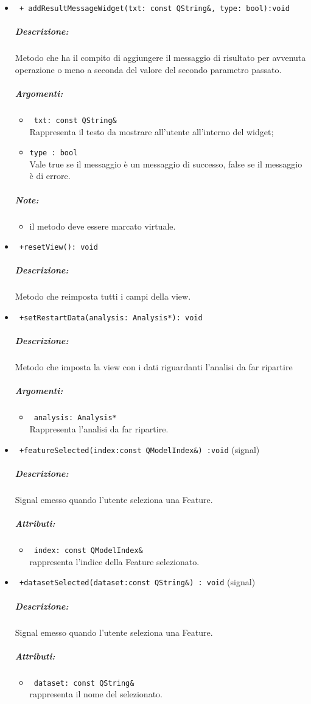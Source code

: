 \begin{itemize}
\item \color{blue} \verb! + addResultMessageWidget(txt: const QString&, type: bool):void! 
\color{black}
\subparagraph{Descrizione:} Metodo che ha il compito di aggiungere il messaggio di risultato per avvenuta operazione o meno a seconda del valore del secondo parametro passato.
\subparagraph{Argomenti:}
\begin{itemize}
\item \color{RoyalPurple} \verb! txt: const QString& ! \\Rappresenta il testo da mostrare all'utente all'interno del widget;
\item \color{RoyalPurple} \verb!type : bool ! \\ Vale true se il messaggio è un messaggio di successo, false se il messaggio è di errore.
\end{itemize}
\subparagraph{Note:}
\begin{itemize}
\item il metodo deve essere marcato virtuale.
\end{itemize} 

\item\color{blue}\verb! +resetView(): void!
\color{black}
\subparagraph{Descrizione:} Metodo che reimposta tutti i campi della view.

\item\color{blue}\verb! +setRestartData(analysis: Analysis*): void!
\color{black}
\subparagraph{Descrizione:} Metodo che imposta la view con i dati riguardanti l'analisi da far ripartire
\subparagraph{Argomenti:}
\begin{itemize}
\item \color{RoyalPurple} \verb! analysis: Analysis*! \\ Rappresenta l'analisi da far ripartire.
\end{itemize}
\item\color{blue}\verb! +featureSelected(index:const QModelIndex&) :void! (signal)
\color{black} 
\subparagraph{Descrizione:}
Signal\g{} emesso quando l'utente seleziona una Feature\g{}.
\subparagraph{Attributi:}
\begin{itemize}
\item \color{RoyalPurple}\verb! index: const QModelIndex& ! \\ rappresenta l'indice della Feature\g{} selezionato.
\end{itemize}

\item\color{blue}\verb! +datasetSelected(dataset:const QString&) : void! (signal)
\color{black} 
\subparagraph{Descrizione:}
Signal\g{} emesso quando l'utente seleziona una Feature\g{}.
\subparagraph{Attributi:}
\begin{itemize}
\item \color{RoyalPurple}\verb! dataset: const QString& ! \\ rappresenta il nome del \dataset{} selezionato.
\end{itemize}


\end{itemize}
